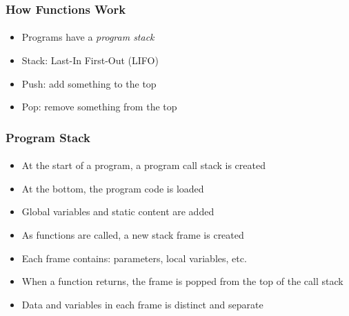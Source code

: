 \documentclass[]{beamer}
\begin{document}
\begin{frame}[fragile]
  \frametitle{How Functions Work}
  \framesubtitle{}

\begin{minipage}[t]{0.6\linewidth}
\begin{itemize}[<+->]
  \item Programs have a \emph{program stack}
  \item Stack: Last-In First-Out (LIFO)
  \item Push: add something to the top
  \item Pop: remove something from the top
\end{itemize}
\end{minipage}
\begin{minipage}[t]{0.30\linewidth}
\end{minipage}

\end{frame}

\begin{frame}[fragile]
  \frametitle{Program Stack}
  \framesubtitle{}

\begin{itemize}[<+->]
  \item At the start of a program, a program call stack is created
  \item At the bottom, the program code is loaded
  \item Global variables and static content are added
  \item As functions are called, a new stack frame is created
  \item Each frame contains: parameters, local variables, etc.
  \item When a function returns, the frame is popped from the top of the call stack
  \item Data and variables in each frame is distinct and separate
\end{itemize}

\end{frame}
\end{document}
